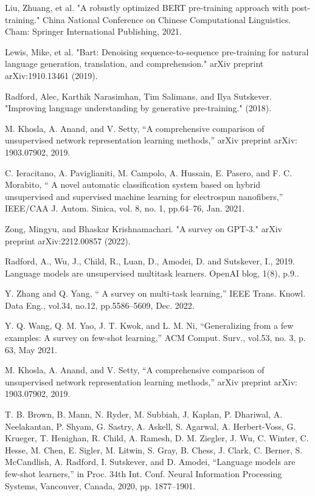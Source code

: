\documentclass[conference]{IEEEtran}
\begin{document}
\begin{thebibliography}{00}
 Liu, Zhuang, et al. "A robustly optimized BERT pre-training approach with post-training." China National Conference on Chinese Computational Linguistics. Cham: Springer International Publishing, 2021.

 Lewis, Mike, et al. "Bart: Denoising sequence-to-sequence pre-training for natural language generation, translation, and comprehension." arXiv preprint arXiv:1910.13461 (2019).

 Radford, Alec, Karthik Narasimhan, Tim Salimans, and Ilya Sutskever. "Improving language understanding by generative pre-training." (2018).

 M. Khosla, A. Anand, and V. Setty, “A comprehensive comparison of unsupervised network representation learning methods,” arXiv preprint arXiv: 1903.07902, 2019.

 C. Ieracitano, A. Paviglianiti, M. Campolo, A. Hussain, E. Pasero, and F. C. Morabito, “ A novel automatic classification system based on hybrid unsupervised and supervised machine learning for electrospun nanofibers,” IEEE/CAA J. Autom. Sinica, vol. 8, no. 1, pp.64–76, Jan. 2021.


 Zong, Mingyu, and Bhaskar Krishnamachari. "A survey on GPT-3." arXiv preprint arXiv:2212.00857 (2022).

 Radford, A., Wu, J., Child, R., Luan, D., Amodei, D. and Sutskever, I., 2019. Language models are unsupervised multitask learners. OpenAI blog, 1(8), p.9..

 Y. Zhang and Q. Yang, “ A survey on multi-task learning,” IEEE Trans. Knowl. Data Eng., vol.34, no.12, pp.5586–5609, Dec. 2022.

 Y. Q. Wang, Q. M. Yao, J. T. Kwok, and L. M. Ni, “Generalizing from a few examples: A survey on few-shot learning,” ACM Comput. Surv., vol.53, no. 3, p. 63, May 2021.

 M. Khosla, A. Anand, and V. Setty, “A comprehensive comparison of unsupervised network representation learning methods,” arXiv preprint arXiv: 1903.07902, 2019.

 T. B. Brown, B. Mann, N. Ryder, M. Subbiah, J. Kaplan, P. Dhariwal, A. Neelakantan, P. Shyam, G. Sastry, A. Askell, S. Agarwal, A. Herbert-Voss, G. Krueger, T. Henighan, R. Child, A. Ramesh, D. M. Ziegler, J. Wu, C. Winter, C. Hesse, M. Chen, E. Sigler, M. Litwin, S. Gray, B. Chess, J. Clark, C. Berner, S. McCandlish, A. Radford, I. Sutskever, and D. Amodei, “Language models are few-shot learners,” in Proc. 34th Int. Conf. Neural Information Processing Systems, Vancouver, Canada, 2020, pp. 1877–1901.



\end{thebibliography}
\end{document}
